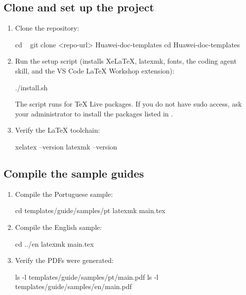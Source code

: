 \documentclass[english]{guide}
\begin{document}
\subsection{Clone and set up the project}

\passoapasso
\begin{enumerate}
  \item Clone the repository:

  \begin{codigo}[bash]
cd ~
git clone <repo-url> Huawei-doc-templates
cd Huawei-doc-templates
  \end{codigo}

  \item Run the setup script (installs XeLaTeX, latexmk, fonts, the coding
        agent skill, and the VS Code LaTeX Workshop extension):

  \begin{codigo}[bash]
./install.sh
  \end{codigo}

  \begin{aviso}
  The script runs  for TeX Live packages. If you
  do not have sudo access, ask your administrator to install the packages
  listed in .
  \end{aviso}

  \item Verify the LaTeX toolchain:

  \begin{codigo}[bash]
xelatex --version
latexmk --version
  \end{codigo}
\end{enumerate}

\subsection{Compile the sample guides}

\passoapasso
\begin{enumerate}
  \item Compile the Portuguese sample:

  \begin{codigo}[bash]
cd templates/guide/samples/pt
latexmk main.tex
  \end{codigo}

  \item Compile the English sample:

  \begin{codigo}[bash]
cd ../en
latexmk main.tex
  \end{codigo}

  \item Verify the PDFs were generated:

  \begin{codigo}[bash]
ls -l templates/guide/samples/pt/main.pdf
ls -l templates/guide/samples/en/main.pdf
  \end{codigo}
\end{enumerate}
\end{document}
